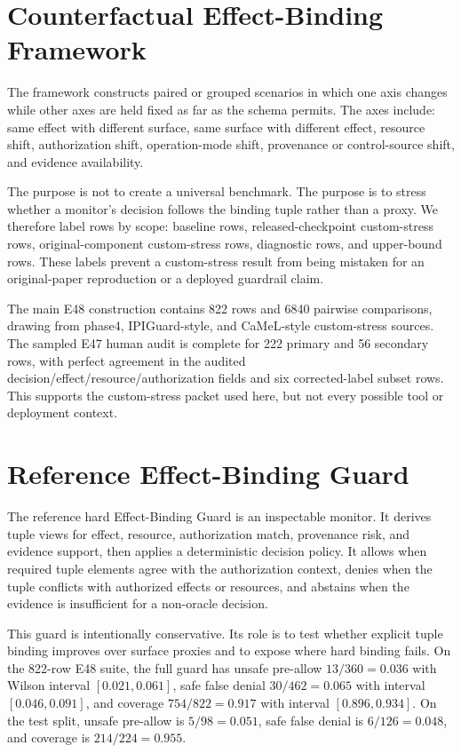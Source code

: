 \documentclass[10pt,twocolumn]{article}
\begin{document}
\section{Counterfactual Effect-Binding Framework}

The framework constructs paired or grouped scenarios in which one axis changes while other axes are held fixed as far as the schema permits. The axes include: same effect with different surface, same surface with different effect, resource shift, authorization shift, operation-mode shift, provenance or control-source shift, and evidence availability.

The purpose is not to create a universal benchmark. The purpose is to stress whether a monitor's decision follows the binding tuple rather than a proxy. We therefore label rows by scope: baseline rows, released-checkpoint custom-stress rows, original-component custom-stress rows, diagnostic rows, and upper-bound rows. These labels prevent a custom-stress result from being mistaken for an original-paper reproduction or a deployed guardrail claim.

The main E48 construction contains 822 rows and 6840 pairwise comparisons, drawing from phase4, IPIGuard-style, and CaMeL-style custom-stress sources. The sampled E47 human audit is complete for 222 primary and 56 secondary rows, with perfect agreement in the audited decision/effect/resource/authorization fields and six corrected-label subset rows. This supports the custom-stress packet used here, but not every possible tool or deployment context.

\section{Reference Effect-Binding Guard}

The reference hard Effect-Binding Guard is an inspectable monitor. It derives tuple views for effect, resource, authorization match, provenance risk, and evidence support, then applies a deterministic decision policy. It allows when required tuple elements agree with the authorization context, denies when the tuple conflicts with authorized effects or resources, and abstains when the evidence is insufficient for a non-oracle decision.

This guard is intentionally conservative. Its role is to test whether explicit tuple binding improves over surface proxies and to expose where hard binding fails. On the 822-row E48 suite, the full guard has unsafe pre-allow $13/360=0.036$ with Wilson interval $[0.021,0.061]$, safe false denial $30/462=0.065$ with interval $[0.046,0.091]$, and coverage $754/822=0.917$ with interval $[0.896,0.934]$. On the test split, unsafe pre-allow is $5/98=0.051$, safe false denial is $6/126=0.048$, and coverage is $214/224=0.955$.
\end{document}
